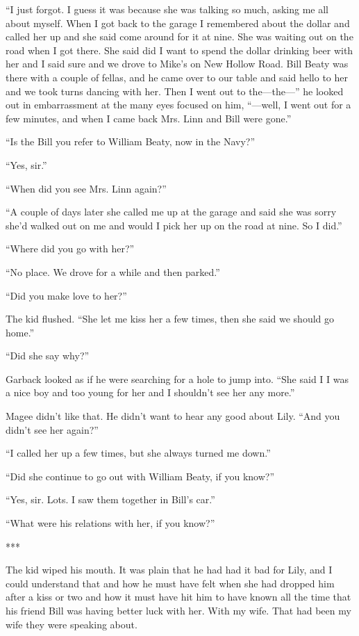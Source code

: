 {“I just forgot. I guess it was because she was talking so much, asking me all about myself. When I got back to the garage I remembered about the dollar and called her up and she said come around for it at nine. She was waiting out on the road when I got there. She said did I want to spend the dollar drinking beer with her and I said sure and we drove to Mike’s on New Hollow Road. Bill Beaty was there with a couple of fellas, and he came over to our table and said hello to her and we took turns dancing with her. Then I went out to the—the—” he looked out in embarrassment at the many eyes focused on him, “—well, I went out for a few minutes, and when I came back Mrs. Linn and Bill were gone.”

“Is the Bill you refer to William Beaty, now in the Navy?”

“Yes, sir.”

“When did you see Mrs. Linn again?”

“A couple of days later she called me up at the garage and said she was sorry she’d walked out on me and would I pick her up on the road at nine. So I did.”

“Where did you go with her?”

“No place. We drove for a while and then parked.”

“Did you make love to her?”

The kid flushed. “She let me kiss her a few times, then she said we should go home.”

“Did she say why?”

Garback looked as if he were searching for a hole to jump into. “She said I I was a nice boy and too young for her and I shouldn’t see her any more.”

Magee didn’t like that. He didn’t want to hear any good about Lily. “And you didn’t see her again?”

“I called her up a few times, but she always turned me down.”

“Did she continue to go out with William Beaty, if you know?”

“Yes, sir. Lots. I saw them together in Bill’s car.”

“What were his relations with her, if you know?”

***

The kid wiped his mouth. It was plain that he had had it bad for Lily, and I could understand that and how he must have felt when she had dropped him after a kiss or two and how it must have hit him to have known all the time that his friend Bill was having better luck with her. With my wife. That had been my wife they were speaking about.

}

